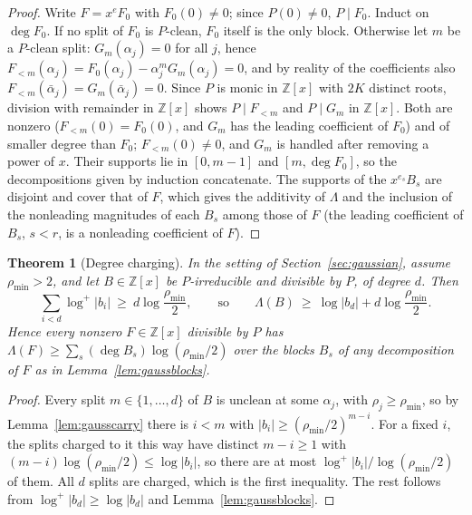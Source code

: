 \documentclass[11pt]{article}
\newtheorem{theorem}{Theorem}[section]
\begin{document}
\begin{proof}
Write $F=x^eF_0$ with $F_0(0)\ne0$; since $P(0)\ne0$, $P\mid F_0$.  Induct
on $\deg F_0$.  If no split of $F_0$ is $P$-clean, $F_0$ itself is the only
block.  Otherwise let $m$ be a $P$-clean split: $G_m(\alpha_j)=0$ for all
$j$, hence $F_{<m}(\alpha_j)=F_0(\alpha_j)-\alpha_j^mG_m(\alpha_j)=0$, and by
reality of the coefficients also $F_{<m}(\bar\alpha_j)=G_m(\bar\alpha_j)=0$.
Since $P$ is monic in $\mathbb Z[x]$ with $2K$ distinct roots, division with
remainder in $\mathbb Z[x]$ shows $P\mid F_{<m}$ and $P\mid G_m$ in
$\mathbb Z[x]$.  Both are nonzero ($F_{<m}(0)=F_0(0)$, and $G_m$ has the leading
coefficient of $F_0$) and of smaller degree than $F_0$; $F_{<m}(0)\ne0$, and
$G_m$ is handled after removing a power of $x$.  Their supports lie in
$[0,m-1]$ and $[m,\deg F_0]$, so the decompositions given by induction
concatenate.  The supports of the $x^{e_s}B_s$ are disjoint and cover that of
$F$, which gives the additivity of $\Lambda$ and the inclusion of the
nonleading magnitudes of each $B_s$ among those of $F$ (the leading
coefficient of $B_s$, $s<r$, is a nonleading coefficient of $F$).
\end{proof}

\begin{theorem}[Degree charging]\label{thm:gausscharge}
In the setting of Section~\ref{sec:gaussian}, assume $\rho_{\min}>2$, and
let $B\in\mathbb Z[x]$ be $P$-irreducible and
divisible by $P$, of degree $d$.  Then
\[
  \sum_{i<d}\log^+|b_i|\ \ge\ d\log\frac{\rho_{\min}}2,
  \qquad\text{so}\qquad
  \Lambda(B)\ \ge\ \log|b_d|+d\log\frac{\rho_{\min}}2 .
\]
Hence every nonzero $F\in\mathbb Z[x]$ divisible by $P$ has
$\Lambda(F)\ge\sum_s(\deg B_s)\log(\rho_{\min}/2)$ over the blocks $B_s$ of
any decomposition of $F$ as in Lemma~\ref{lem:gaussblocks}.
\end{theorem}

\begin{proof}
Every split $m\in\{1,\ldots,d\}$ of $B$ is unclean at some $\alpha_j$, with
$\rho_j\ge\rho_{\min}$, so by Lemma~\ref{lem:gausscarry} there is $i<m$ with
$|b_i|\ge(\rho_{\min}/2)^{m-i}$.  For a fixed $i$, the splits charged to it
this way have distinct $m-i\ge1$ with
$(m-i)\log(\rho_{\min}/2)\le\log|b_i|$, so there are at most
$\log^+|b_i|/\log(\rho_{\min}/2)$ of them.  All $d$ splits are charged, which
is the first inequality.  The rest follows from $\log^+|b_d|\ge\log|b_d|$ and
Lemma~\ref{lem:gaussblocks}.
\end{proof}
\end{document}
